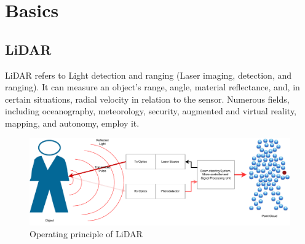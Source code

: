 \chapter{Basics}

\section{LiDAR}
LiDAR refers to Light detection and ranging (Laser imaging, detection, and ranging). It can measure an object's range, angle, material reflectance, and, in certain situations, radial velocity in relation to the sensor. Numerous fields, including oceanography, meteorology, security, augmented and virtual reality, mapping, and autonomy, employ it.
\begin{figure}[htbp]
    \centering
    \includegraphics[width=0.8\linewidth]{97_graphics/related_work/lidar_principle.pdf}
    \caption{Operating principle of LiDAR}
    \label{fig:related_work-lidar}
\end{figure}

